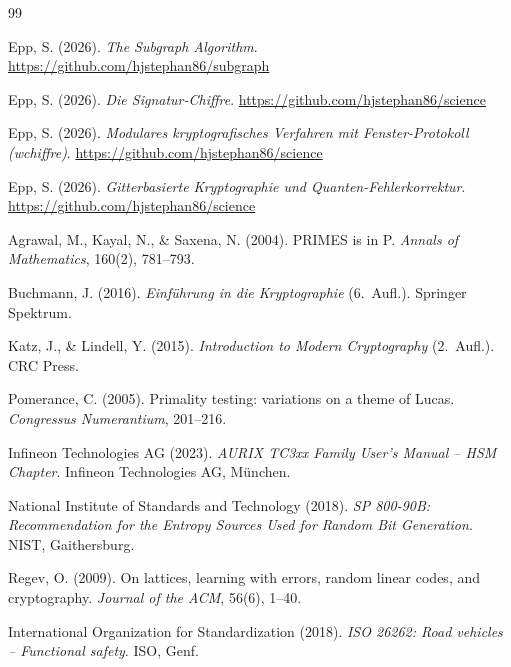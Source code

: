 ﻿\documentclass[a4paper,12pt]{article}
\theoremstyle{definition}
\begin{document}
\begin{thebibliography}{99}

 Epp, S. (2026). \emph{The Subgraph Algorithm}. \url{https://github.com/hjstephan86/subgraph}

 Epp, S. (2026). \emph{Die Signatur-Chiffre}. \url{https://github.com/hjstephan86/science}

 Epp, S. (2026). \emph{Modulares kryptografisches Verfahren mit Fenster-Protokoll (wchiffre)}. \url{https://github.com/hjstephan86/science}

 Epp, S. (2026). \emph{Gitterbasierte Kryptographie und Quanten-Fehlerkorrektur}. \url{https://github.com/hjstephan86/science}

 Agrawal, M., Kayal, N., \& Saxena, N. (2004). PRIMES is in P. \emph{Annals of Mathematics}, 160(2), 781--793.

 Buchmann, J. (2016). \emph{Einführung in die Kryptographie} (6.\ Aufl.). Springer Spektrum.

 Katz, J., \& Lindell, Y. (2015). \emph{Introduction to Modern Cryptography} (2.\ Aufl.). CRC Press.

 Pomerance, C. (2005). Primality testing: variations on a theme of Lucas. \emph{Congressus Numerantium}, 201--216.

 Infineon Technologies AG (2023). \emph{AURIX TC3xx Family User's Manual -- HSM Chapter}. Infineon Technologies AG, München.

 National Institute of Standards and Technology (2018). \emph{SP 800-90B: Recommendation for the Entropy Sources Used for Random Bit Generation}. NIST, Gaithersburg.

 Regev, O. (2009). On lattices, learning with errors, random linear codes, and cryptography. \emph{Journal of the ACM}, 56(6), 1--40.

 International Organization for Standardization (2018). \emph{ISO 26262: Road vehicles -- Functional safety}. ISO, Genf.

\end{thebibliography}
\end{document}
